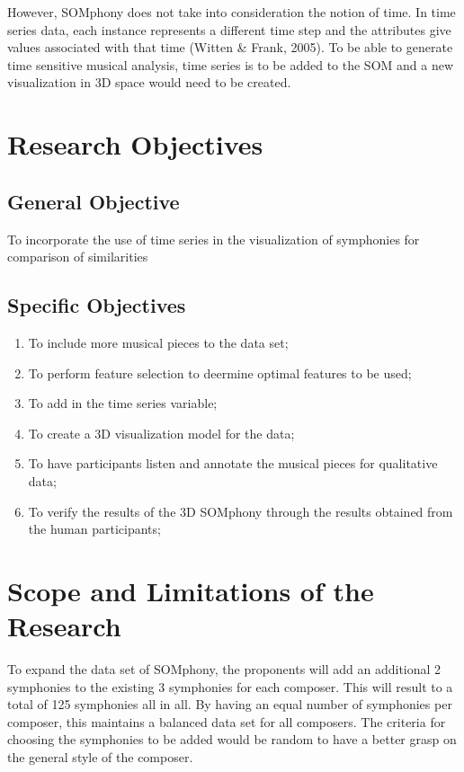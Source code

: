 However, SOMphony does not take into consideration the notion of time. In time series data, each instance represents a different time step and the attributes give values associated with that time (Witten  \& Frank, 2005).  To be able to generate time sensitive musical analysis, time series is to be added to the SOM and a new visualization in 3D space would need to be created.

\section{Research Objectives}
\label{sec:researchobjectives}
\subsection{General Objective}
\label{sec:generalobjective}
To incorporate the use of time series in the visualization of symphonies for comparison of similarities
\subsection{Specific Objectives}
\label{sec:specificobjectives}
\begin{enumerate}
\item To include more musical pieces to the data set;
\item To perform feature selection to deermine optimal features to be used;
\item To add in the time series variable;
\item To create a 3D visualization model for the data;
\item To have participants listen and annotate the musical pieces for qualitative data;
\item To verify the results of the 3D SOMphony through the results obtained from the human participants;
\end{enumerate}
\section{Scope and Limitations of the Research}
\label{sec:scopelimitations}
To expand the data set of SOMphony, the proponents will add an additional 2 symphonies to the existing 3 symphonies for each composer. This will result to a total of 125 symphonies all in all. By having an equal number of symphonies per composer, this maintains a balanced data set for all composers. The criteria for choosing the symphonies to be added would be random to have a better grasp on the general style of the composer.

